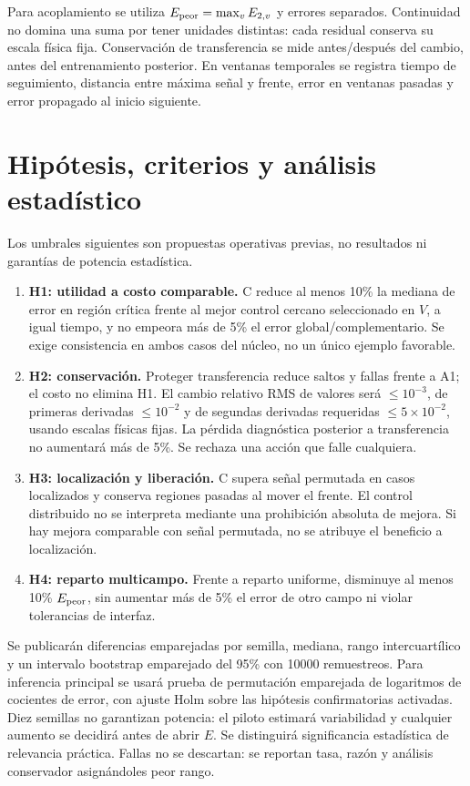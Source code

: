 Para acoplamiento se utiliza $E_{\rm peor}=\max_v E_{2,v}$ y errores separados. Continuidad no domina una suma por tener unidades distintas: cada residual conserva su escala física fija. Conservación de transferencia se mide antes/después del cambio, antes del entrenamiento posterior. En ventanas temporales se registra tiempo de seguimiento, distancia entre máxima señal y frente, error en ventanas pasadas y error propagado al inicio siguiente.

\section{Hipótesis, criterios y análisis estadístico}
Los umbrales siguientes son propuestas operativas previas, no resultados ni garantías de potencia estadística.
\begin{enumerate}
\item \textbf{H1: utilidad a costo comparable.} C reduce al menos 10\% la mediana de error en región crítica frente al mejor control cercano seleccionado en $V$, a igual tiempo, y no empeora más de 5\% el error global/complementario. Se exige consistencia en ambos casos del núcleo, no un único ejemplo favorable.
\item \textbf{H2: conservación.} Proteger transferencia reduce saltos y fallas frente a A1; el costo no elimina H1. El cambio relativo RMS de valores será $\leq10^{-3}$, de primeras derivadas $\leq10^{-2}$ y de segundas derivadas requeridas $\leq5\times10^{-2}$, usando escalas físicas fijas. La pérdida diagnóstica posterior a transferencia no aumentará más de 5\%. Se rechaza una acción que falle cualquiera.
\item \textbf{H3: localización y liberación.} C supera señal permutada en casos localizados y conserva regiones pasadas al mover el frente. El control distribuido no se interpreta mediante una prohibición absoluta de mejora. Si hay mejora comparable con señal permutada, no se atribuye el beneficio a localización.
\item \textbf{H4: reparto multicampo.} Frente a reparto uniforme, disminuye al menos 10\% $E_{\rm peor}$, sin aumentar más de 5\% el error de otro campo ni violar tolerancias de interfaz.
\end{enumerate}
Se publicarán diferencias emparejadas por semilla, mediana, rango intercuartílico y un intervalo bootstrap emparejado del 95\% con 10000 remuestreos. Para inferencia principal se usará prueba de permutación emparejada de logaritmos de cocientes de error, con ajuste Holm sobre las hipótesis confirmatorias activadas. Diez semillas no garantizan potencia: el piloto estimará variabilidad y cualquier aumento se decidirá antes de abrir $E$. Se distinguirá significancia estadística de relevancia práctica. Fallas no se descartan: se reportan tasa, razón y análisis conservador asignándoles peor rango.

